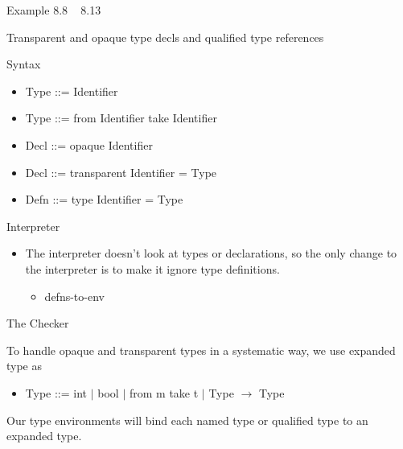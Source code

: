 \documentclass{article}
\begin{document}
\begin{huge}
Example 8.8 ~ 8.13



Transparent and opaque type decls and qualified type references

Syntax 
\begin{itemize}
\item Type ::= Identifier \\
\item Type ::= from Identifier take Identifier \\
\item Decl ::= opaque Identifier \\
\item Decl ::= transparent Identifier = Type \\
\item Defn ::= type Identifier = Type \\
\end{itemize}




Interpreter

\begin{itemize}
\item The interpreter doesn't look at types or declarations, so the only change to the interpreter is to make it
ignore type definitions.
\begin{itemize}
\item defns-to-env 
\end{itemize}
\end{itemize}



The Checker

To handle opaque and transparent types in a systematic way, we use expanded type as
\begin{itemize}
\item Type ::= int $|$ bool $|$ from m take t $|$ Type $\rightarrow$ Type
\end{itemize}

Our type environments will bind each named type or qualified type to an expanded type. 


\end{huge}
\end{document}
